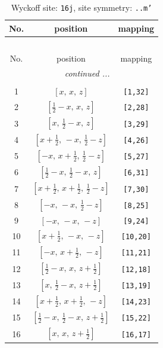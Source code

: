 \documentclass[fleqn,8pt]{jsarticle}
\begin{document}
\renewcommand{\arraystretch}{1.2}
\begin{longtable}{ccc}
\caption{Wyckoff site: {\tt 16j}, site symmetry: {\tt ..m'}}
 \\
 \hline \hline
No. & position & mapping \\ \hline \endfirsthead

\multicolumn{2}{l}{\tablename\ \thetable{}} \\
 \hline \hline
No. & position & mapping \\ \hline \endhead

 \hline \hline
\multicolumn{2}{r}{\footnotesize\it continued ...} \\ \endfoot

 \hline \hline
\multicolumn{2}{r}{} \\ \endlastfoot

1 & $\left[ x,\, x,\, z \right]$ & {\tt [1,32]} \\ \hline
2 & $\left[ \frac{1}{2} - x,\, x,\, z \right]$ & {\tt [2,28]} \\ \hline
3 & $\left[ x,\, \frac{1}{2} - x,\, z \right]$ & {\tt [3,29]} \\ \hline
4 & $\left[ x + \frac{1}{2},\, - x,\, \frac{1}{2} - z \right]$ & {\tt [4,26]} \\ \hline
5 & $\left[ - x,\, x + \frac{1}{2},\, \frac{1}{2} - z \right]$ & {\tt [5,27]} \\ \hline
6 & $\left[ \frac{1}{2} - x,\, \frac{1}{2} - x,\, z \right]$ & {\tt [6,31]} \\ \hline
7 & $\left[ x + \frac{1}{2},\, x + \frac{1}{2},\, \frac{1}{2} - z \right]$ & {\tt [7,30]} \\ \hline
8 & $\left[ - x,\, - x,\, \frac{1}{2} - z \right]$ & {\tt [8,25]} \\ \hline
9 & $\left[ - x,\, - x,\, - z \right]$ & {\tt [9,24]} \\ \hline
10 & $\left[ x + \frac{1}{2},\, - x,\, - z \right]$ & {\tt [10,20]} \\ \hline
11 & $\left[ - x,\, x + \frac{1}{2},\, - z \right]$ & {\tt [11,21]} \\ \hline
12 & $\left[ \frac{1}{2} - x,\, x,\, z + \frac{1}{2} \right]$ & {\tt [12,18]} \\ \hline
13 & $\left[ x,\, \frac{1}{2} - x,\, z + \frac{1}{2} \right]$ & {\tt [13,19]} \\ \hline
14 & $\left[ x + \frac{1}{2},\, x + \frac{1}{2},\, - z \right]$ & {\tt [14,23]} \\ \hline
15 & $\left[ \frac{1}{2} - x,\, \frac{1}{2} - x,\, z + \frac{1}{2} \right]$ & {\tt [15,22]} \\ \hline
16 & $\left[ x,\, x,\, z + \frac{1}{2} \right]$ & {\tt [16,17]} \\
\end{longtable}
\end{document}
